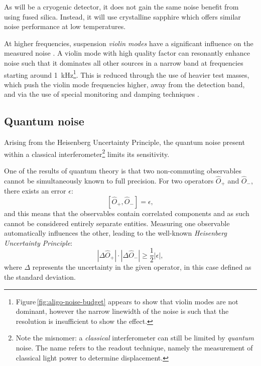 As \KAGRA{} will be a cryogenic detector, it does not gain the same noise benefit from using fused silica. Instead, it will use crystalline sapphire which offers similar noise performance at low temperatures.

At higher frequencies, suspension \emph{violin modes} have a significant influence on the measured noise \cite{Robertson2002}. A violin mode with high quality factor can resonantly enhance noise such that it dominates all other sources in a narrow band at frequencies starting around \SI{1}{\kilo\hertz}\footnote{Figure\,\ref{fig:aligo-noise-budget} appears to show that violin modes are not dominant, however the narrow linewidth of the noise is such that the resolution is insufficient to show the effect.}. This is reduced through the use of heavier test masses, which push the violin mode frequencies higher, away from the detection band, and via the use of special monitoring and damping techniques \cite{Sorazu2010} .

\subsection{Quantum noise}
Arising from the Heisenberg Uncertainty Principle, the quantum noise present within a classical interferometer\footnote{Note the misnomer: a \emph{classical} interferometer can still be limited by \emph{quantum} noise. The name refers to the readout technique, namely the measurement of classical light power to determine displacement.} limits its sensitivity.

One of the results of quantum theory is that two non-commuting observables cannot be simultaneously known to full precision. For two operators $\hat{O}_+$ and $\hat{O}_-$, there exists an error $\epsilon$:
\begin{equation}
 \left[ \hat{O}_+, \hat{O}_- \right] = \epsilon,
\end{equation}
and this means that the observables contain correlated components and as such cannot be considered entirely separate entities. Measuring one observable automatically influences the other, leading to the well-known \emph{Heisenberg Uncertainty Principle}:
\begin{equation}
 \left| \Delta \hat{O}_+ \right| \cdot \left| \Delta \hat{O}_- \right| \geq
\frac{1}{2} \left| \epsilon \right|,
\end{equation}
where $\Delta$ represents the uncertainty in the given operator, in this case defined as the standard deviation.

